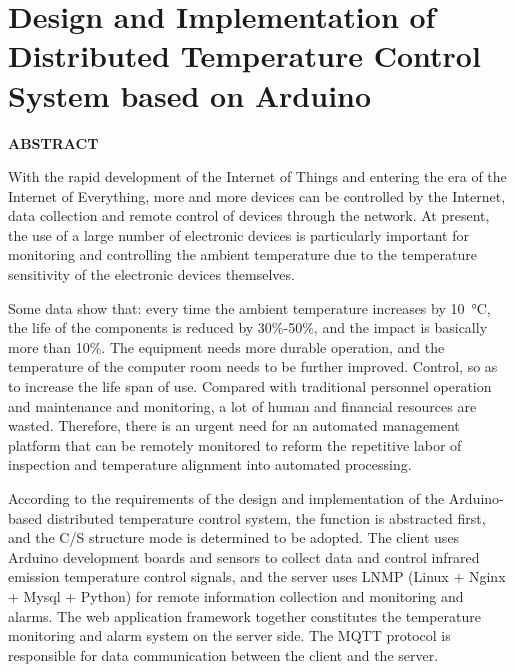 \clearpage
{}
\thispagestyle{abstractStyleEn} 

\section*{\songti{} \centering \textbf{Design and Implementation of Distributed Temperature Control System based on Arduino}}

\begin{center}
	\textbf{ABSTRACT}
\end{center}
\vspace{2em}

With the rapid development of the Internet of Things and entering the era of the Internet of Everything, more and more devices can be controlled by the Internet, data collection and remote control of devices through the network. At present, the use of a large number of electronic devices is particularly important for monitoring and controlling the ambient temperature due to the temperature sensitivity of the electronic devices themselves.

Some data show that: every time the ambient temperature increases by \SI{10}{\degreeCelsius}, the life of the components is reduced by 30\%-50\%, and the impact is basically more than 10\%. The equipment needs more durable operation, and the temperature of the computer room needs to be further improved. Control, so as to increase the life span of use. Compared with traditional personnel operation and maintenance and monitoring, a lot of human and financial resources are wasted. Therefore, there is an urgent need for an automated management platform that can be remotely monitored to reform the repetitive labor of inspection and temperature alignment into automated processing.

According to the requirements of the design and implementation of the Arduino-based distributed temperature control system, the function is abstracted first, and the C/S structure mode is determined to be adopted. The client uses Arduino development boards and sensors to collect data and control infrared emission temperature control signals, and the server uses LNMP (Linux + Nginx + Mysql + Python) for remote information collection and monitoring and alarms. The web application framework together constitutes the temperature monitoring and alarm system on the server side. The MQTT protocol is responsible for data communication between the client and the server.

